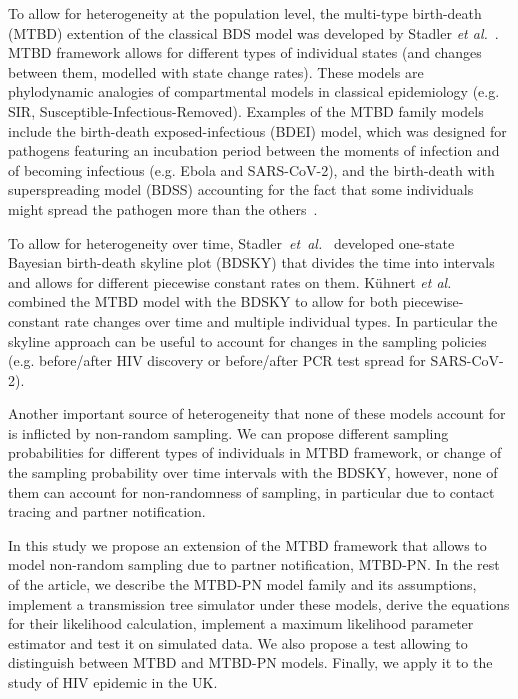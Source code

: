 \documentclass[a4paper,10pt]{article}
\begin{document}
To allow for heterogeneity at the population level, the multi-type birth-death (MTBD) extention of the classical BDS model was developed by Stadler \textit{et al.}~\cite{Stadler2013a}. MTBD framework allows for different types of individual states (and changes between them, modelled with state change rates). These models are phylodynamic analogies of compartmental models in classical epidemiology (e.g. SIR, Susceptible-Infectious-Removed).  Examples of the MTBD family models include the birth-death exposed-infectious (BDEI) model, which was designed for pathogens featuring an incubation period between the moments of infection and of becoming infectious (e.g. Ebola and SARS-CoV-2), and the birth-death with superspreading model (BDSS) accounting for the fact that some individuals might spread the pathogen more than the others~\cite{Stadler2014}.

To allow for heterogeneity over time, Stadler~\textit{et~al.}~\cite{Stadler2013} developed one-state Bayesian birth-death skyline plot (BDSKY) that divides the time into intervals and allows for different piecewise constant rates on them. K\"{u}hnert \textit{et al.}~\cite{Kuhnert2016} combined the MTBD model with the BDSKY to allow for both piecewise-constant rate changes over time and multiple individual types. In particular the skyline approach can be useful to account for changes in the sampling policies (e.g. before/after HIV discovery or before/after PCR test spread for SARS-CoV-2).


Another important source of heterogeneity that none of these models account for is inflicted by non-random sampling. We can propose different sampling probabilities for different types of individuals in MTBD framework, or change of the sampling probability over time intervals with the BDSKY, however, none of them can account for non-randomness of sampling, in particular due to contact tracing and partner notification. 

In this study we propose an extension of the MTBD framework that allows to model non-random sampling due to partner notification, MTBD-PN. In the rest of the article, we describe the MTBD-PN model family and its assumptions, implement a transmission tree simulator under these models, derive the equations for their likelihood calculation, implement a maximum likelihood parameter estimator and test it on simulated data. We also propose a test allowing to distinguish between MTBD and MTBD-PN models. Finally, we apply it to the study of HIV epidemic in the UK.
\end{document}
